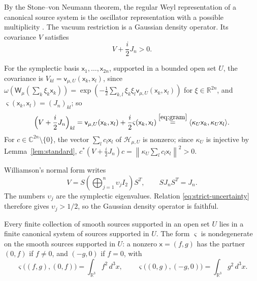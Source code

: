 \documentclass[11pt]{amsart}
\numberwithin{equation}{section}
\theoremstyle{definition}
\newcommand{\R}{\mathbb R}
\newcommand{\C}{\mathbb C}
\newcommand{\Hh}{\mathcal H}
\newcommand{\vv}{\mathsf v}
\newcommand{\sx}{\mathsf x}
\newcommand{\norm}[1]{\left\|#1\right\|}
\newcommand{\ip}[2]{\langle #1,#2\rangle}
\begin{document}
By the Stone--von Neumann theorem, the regular Weyl representation of a
canonical source system is
the oscillator representation with a possible multiplicity
\cite{Haag96}. The vacuum restriction is a Gaussian density operator.
Its covariance \(V\) satisfies
\begin{equation}
 V+\frac i2J_n>0.
 \label{eq:strict-uncertainty}
\end{equation}

For the symplectic basis
\(\sx_1,\dots,\sx_{2n}\), supported in a bounded open set \(U\), the
covariance is \(V_{kl}=\vv_{\mu,U}(\sx_k,\sx_l)\), since
\(\omega(\mathsf W_\mu(\sum_k\xi_k\sx_k))
=\exp(-\frac12\sum_{k,l}\xi_k\xi_l\vv_{\mu,U}(\sx_k,\sx_l))\) for
\(\xi\in\R^{2n}\), and \(\varsigma(\sx_k,\sx_l)=(J_n)_{kl}\); so
\[
 \Bigl(V+\frac i2J_n\Bigr)_{kl}
 =\vv_{\mu,U}(\sx_k,\sx_l)+\frac i2\varsigma(\sx_k,\sx_l)
 \overset{\eqref{eq:gram}}{=}\ip{\kappa_U\sx_k}{\kappa_U\sx_l}.
\]
For \(c\in\C^{2n}\setminus\{0\}\), the vector \(\sum_lc_l\sx_l\) of
\(\Hh_{\mu,U}\) is nonzero; since
\(\kappa_U\) is injective by Lemma~\ref{lem:standard},
\(c^*(V+\frac i2J_n)c=\norm{\kappa_U\sum_lc_l\sx_l}^2>0\).

Williamson's normal form \cite{Williamson36} writes
\[
 V=S\left(\bigoplus_{j=1}^n\upsilon_j I_2\right)S^T,\qquad
 SJ_nS^T=J_n.
\]
The numbers \(\upsilon_j\) are the symplectic eigenvalues. Relation \eqref{eq:strict-uncertainty} therefore
gives \(\upsilon_j>1/2\), so the Gaussian density operator is faithful.

Every finite collection of smooth sources supported in an open set
\(U\) lies in a finite canonical system of sources supported in \(U\).
The form \(\varsigma\) is nondegenerate on the
smooth sources supported in \(U\): a nonzero \(\sx=(f,g)\) has the
partner \((0,f)\) if \(f\ne0\), and \((-g,0)\) if \(f=0\), with
\[
 \varsigma\bigl((f,g),(0,f)\bigr)=\int_{\R^3}f^2\,d^3x,\qquad
 \varsigma\bigl((0,g),(-g,0)\bigr)=\int_{\R^3}g^2\,d^3x.
\]
\end{document}
